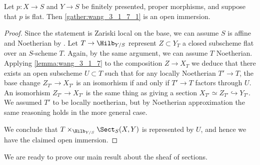            \begin{lemma}
               \label{lemma:wang_3_1_8}
               Let $p\colon X \to S$ and $Y \to S$ be finitely presented, proper morphisms, and suppose that $p$ is flat. Then \cref{gather:wang_3_1_7_1} is an open immersion.
           \end{lemma}
           \begin{proof}
               Since the statement is Zariski local on the base, we can assume $S$ is affine and Noetherian by \cite[Tome~3, 8]{EGA4}. Let $T \to \Hilb_{Y/S}$ represent $Z \subset Y_T$ a closed subscheme flat over an $S$-scheme $T$. Again, by the same argument, we can assume $T$ Noetherian. Applying \cref{lemma:wang_3_1_7} to the composition $Z \to X_T$ we deduce that there exists an open subscheme $U \subset T$ such that for any locally Noetherian $T' \to T$, the base change $Z_{T'} \to X_{T'}$ is an isomorhism if and only if $T' \to T$ factors through $U$.
               An isomorhism $Z_{T'} \to X_{T'}$ is the same thing as giving a section $X_{T'} \simeq Z_{T'} \hookrightarrow Y_{T'}$. We assumed $T'$ to be locally noetherian, but by Noetherian approximation the same reasoning holds in the more general case.

               We conclude that $T \times_{\Hilb_{Y/S}} \Sect_S(X, Y)$ is represented by $U$, and hence we have the claimed open immersion.
           \end{proof}

           We are ready to prove our main result about the sheaf of sections.
           
